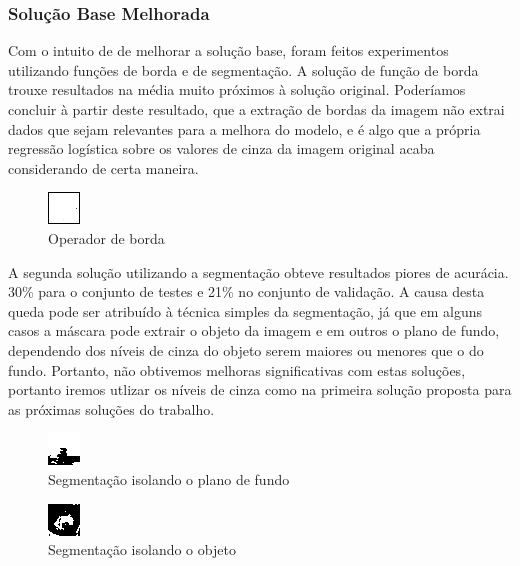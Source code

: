 \documentclass[conference]{IEEEtran}
\begin{document}
\subsubsection{Solução Base Melhorada}
Com o intuito de de melhorar a solução base, foram feitos experimentos utilizando funções de borda e de segmentação. A solução de função de borda trouxe resultados na média muito próximos à solução original. Poderíamos concluir à partir deste resultado, que a extração de bordas da imagem não extrai dados que sejam relevantes para a melhora do modelo, e é algo que a própria regressão logística sobre os valores de cinza da imagem original acaba considerando de certa maneira.

\begin{figure}[H]
  \includegraphics[center]{bor.png}
  \caption{Operador de borda}
  \label{fig:frog1}
\end{figure}

A segunda solução utilizando a segmentação obteve resultados piores de acurácia. 30\% para o conjunto de testes e 21\% no conjunto de validação. A causa desta queda pode ser atribuído à técnica simples da segmentação, já que em alguns casos a máscara pode extrair o objeto da imagem e em outros o plano de fundo, dependendo dos níveis de cinza do objeto serem maiores ou menores que o do fundo. Portanto, não obtivemos melhoras significativas com estas soluções, portanto iremos utlizar os níveis de cinza como na primeira solução proposta para as próximas soluções do trabalho.

\begin{figure}[H]
  \includegraphics[center]{seg1.png}
  \caption{Segmentação isolando o plano de fundo}
  \label{fig:boat1}
\end{figure}

\begin{figure}[H]
  \includegraphics[center]{seg2.png}
  \caption{Segmentação isolando o objeto}
  \label{fig:frog1}
\end{figure}
\end{document}
